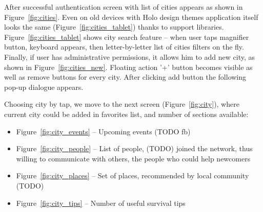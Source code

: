\documentclass[runningheads,a4paper]{llncs}
\begin{document}
After successful authentication screen with list of cities appears as shown in
Figure~\ref{fig:cities}. Even on old devices with Holo design themes application
itself looks the same (Figure~\ref{fig:cities_tablet}) thanks to support libraries.
Figure~\ref{fig:cities_tablet} shows city search feature -- when user taps magnifier
button, keyboard appears, then letter-by-letter list of cities filters on the fly.
Finally, if user has administrative permissions, it allows him to add new city,
as shown in Figure~\ref{fig:cities_new}. Floating action '+' button becomes visible as well as remove buttons for every city. After clicking add button the following pop-up dialogue appears.

Choosing city by tap, we move to the next screen (Figure~\ref{fig:city}), where
current city could be added in favorites list, and number of sections available:
\begin{itemize}
	\item Figure~\ref{fig:city_events} -- Upcoming events (TODO fb)
	\item Figure~\ref{fig:city_people} -- List of people, (TODO) joined the network,
		thus willing to communicate with others, the people who could help newcomers
	\item Figure~\ref{fig:city_places} -- Set of places, recommended by local 
		community (TODO)
	\item Figure~\ref{fig:city_tips} -- Number of useful survival tips
\end{itemize}
\end{document}
